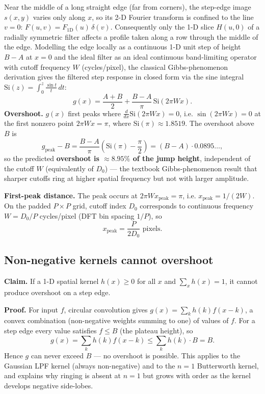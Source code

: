 \documentclass[11pt]{article}
\begin{document}
Near the middle of a long straight edge (far from corners), the step-edge image $s(x,y)$ varies
only along $x$, so its 2-D Fourier transform is confined to the line $v=0$:
$F(u,v) = F_{\mathrm{1D}}(u)\,\delta(v)$. Consequently only the 1-D slice $H(u,0)$ of a radially
symmetric filter affects a profile taken along a row through the middle of the edge. Modelling the
edge locally as a continuous 1-D unit step of height $B-A$ at $x=0$ and the ideal filter as an
ideal continuous band-limiting operator with cutoff frequency $W$ (cycles/pixel), the classical
Gibbs-phenomenon derivation gives the filtered step response in closed form via the sine integral
$\mathrm{Si}(z) = \int_0^z \frac{\sin t}{t}\,dt$:
\begin{equation}
  g(x) = \frac{A+B}{2} + \frac{B-A}{\pi}\,\mathrm{Si}(2\pi W x).
\end{equation}
\textbf{Overshoot.} $g(x)$ first peaks where $\frac{d}{dx}\mathrm{Si}(2\pi Wx)=0$, i.e.
$\sin(2\pi Wx)=0$ at the first nonzero point $2\pi W x=\pi$, where $\mathrm{Si}(\pi)\approx1.8519$.
The overshoot above $B$ is
\begin{equation}
  g_{\text{peak}} - B = \frac{B-A}{\pi}\left(\mathrm{Si}(\pi)-\frac{\pi}{2}\right)
  = (B-A)\cdot 0.0895\ldots,
\end{equation}
so the predicted \textbf{overshoot is $\approx 8.95\%$ of the jump height}, independent of the
cutoff $W$ (equivalently of $D_0$) --- the textbook Gibbs-phenomenon result that sharper cutoffs
ring at higher spatial frequency but not with larger amplitude.

\textbf{First-peak distance.} The peak occurs at $2\pi W x_{\text{peak}} = \pi$, i.e.
$x_{\text{peak}} = 1/(2W)$. On the padded $P\times P$ grid, cutoff index $D_0$ corresponds to
continuous frequency $W = D_0/P$ cycles/pixel (DFT bin spacing $1/P$), so
\begin{equation}
  x_{\text{peak}} = \frac{P}{2D_0} \text{ pixels}.
\end{equation}

\subsection{Non-negative kernels cannot overshoot}

\textbf{Claim.} If a 1-D spatial kernel $h(x)\ge 0$ for all $x$ and $\sum_x h(x)=1$, it cannot
produce overshoot on a step edge.

\textbf{Proof.} For input $f$, circular convolution gives $g(x)=\sum_k h(k)f(x-k)$, a convex
combination (non-negative weights summing to one) of values of $f$. For a step edge every value
satisfies $f\le B$ (the plateau height), so
\begin{equation}
  g(x) = \sum_k h(k) f(x-k) \le \sum_k h(k)\cdot B = B.
\end{equation}
Hence $g$ can never exceed $B$ --- no overshoot is possible. This applies to the Gaussian LPF
kernel (always non-negative) and to the $n=1$ Butterworth kernel, and explains why ringing is
absent at $n=1$ but grows with order as the kernel develops negative side-lobes.
\end{document}
